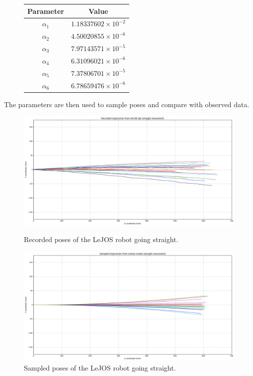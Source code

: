\documentclass[paper=a4, fontsize=11pt]{scrartcl} %
\begin{document}
    
    \begin{figure}[h!]
        \centering
        \def\arraystretch{1.5}
        \begin{tabular}{|c|c|}
            \hline
            Parameter & Value \\
            \hline
            $\alpha_1$ & $1.18337602\times 10 ^{-2}$ \\
            $\alpha_2$ & $4.50020855\times 10 ^{-6}$ \\
            $\alpha_3$ & $7.97143571\times 10 ^{-5}$ \\
            $\alpha_4$ & $6.31096021\times 10 ^{-6}$ \\
            $\alpha_5$ & $7.37806701\times 10 ^{-5}$ \\
            $\alpha_6$ & $6.78659476\times 10 ^{-6}$ \\
            \hline
        \end{tabular}
    \end{figure}

    \newpage
    The parameters are then used to sample poses and compare with observed data.

	\begin{figure}[H]
		\centering
		\begin{minipage}{\textwidth}
			\centering
			\includegraphics[width=1\textwidth]{images/recorded_poses_straight.png} %
			\caption{Recorded poses of the LeJOS robot going straight.}
		\end{minipage}\hfill
		\begin{minipage}{\textwidth}
			\centering
			\includegraphics[width=1\textwidth]{images/sampled_poses_straight.png} %
			\caption{Sampled poses of the LeJOS robot going straight.}
		\end{minipage}
	\end{figure}
\end{document}
